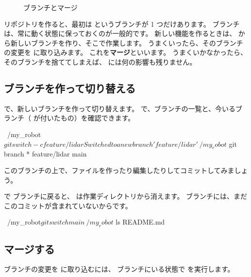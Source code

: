\begin{figure}[tb]
  \centering
  
  \caption{ブランチとマージ}
  \label{fig:git-branch}
\end{figure}

リポジトリを作ると、最初は  というブランチが 1 つだけあります。
 ブランチは、常に動く状態に保っておくのが一般的です。
新しい機能を作るときは、 から新しいブランチを作り、そこで作業します。
うまくいったら、そのブランチの変更を  に取り込みます。
これを\textbf{マージ}といいます。
うまくいかなかったら、そのブランチを捨ててしまえば、 には何の影響も残りません。

\subsection{ブランチを作って切り替える}

 で、新しいブランチを作って切り替えます。
 で、ブランチの一覧と、今いるブランチ（\cmd{*} が付いたもの）を確認できます。

\begin{terminal}[ブランチを作って切り替える]
~/my_robot$ git switch -c feature/lidar
Switched to a new branch 'feature/lidar'
~/my_robot$ git branch
* feature/lidar
  main
\end{terminal}

このブランチの上で、ファイルを作ったり編集したりしてコミットしてみましょう。


 で  ブランチに戻ると、 は作業ディレクトリから消えます。
 ブランチには、まだこのコミットが含まれていないからです。

\begin{terminal}
~/my_robot$ git switch main
~/my_robot$ ls
README.md
\end{terminal}

\subsection{マージする}

 ブランチの変更を  に取り込むには、 ブランチにいる状態で  を実行します。

